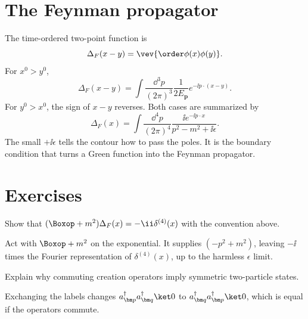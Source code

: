 \section{The Feynman propagator}

The time-ordered two-point function is
\[
  \Delta_F(x-y)=\vev{\order\phi(x)\phi(y)}.
\]
For \(x^0>y^0\),
\[
  \Delta_F(x-y)=
  \int\frac{\dd^3p}{(2\pi)^3}\frac1{2E_{\bm p}}
  e^{-\ii p\cdot(x-y)}.
\]
For \(y^0>x^0\), the sign of \(x-y\) reverses.  Both cases are summarized by
\[
  \Delta_F(x)
  =
  \int\frac{\dd^4p}{(2\pi)^4}
  \frac{\ii e^{-\ii p\cdot x}}{p^2-m^2+\ii\epsilon}.
\]
The small \(+\ii\epsilon\) tells the contour how to pass the poles.  It is the boundary condition that turns a Green function into the Feynman propagator.

\section*{Exercises}

\begin{exercise}
Show that \((\Boxop+m^2)\Delta_F(x)=-\ii\delta^{(4)}(x)\) with the convention above.
\begin{answer}
Act with \(\Boxop+m^2\) on the exponential.  It supplies \((-p^2+m^2)\), leaving \(-\ii\) times the Fourier representation of \(\delta^{(4)}(x)\), up to the harmless \(\epsilon\) limit.
\end{answer}
\end{exercise}

\begin{exercise}
Explain why commuting creation operators imply symmetric two-particle states.
\begin{answer}
Exchanging the labels changes \(a_{\bm p}^\dagger a_{\bm q}^\dagger\ket0\) to \(a_{\bm q}^\dagger a_{\bm p}^\dagger\ket0\), which is equal if the operators commute.
\end{answer}
\end{exercise}

